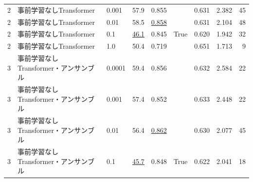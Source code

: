 \documentclass[12pt]{jarticle}
\numberwithin{equation}{section}    %
\numberwithin{figure}{section}      %
\numberwithin{table}{section}      %
\begin{document}
\begin{table}[bt]
\begin{center}
{\begin{tabular}{|l|l|l|rrc|rrr|}
                2                        & 事前学習なしTransformer        & 0.001                                    & 57.9                         & 0.855                     &                            & 0.631                         & 2.382                             & 45                         \\
                2                        & 事前学習なしTransformer        & 0.01                                     & 58.5                         & \underline{0.858}         &                            & 0.631                         & 2.104                             & 48                         \\
                2                        & 事前学習なしTransformer        & 0.1                                      & \underline{46.1}             & 0.845                     & True                       & 0.620                         & 1.942                             & 32                         \\
                2                        & 事前学習なしTransformer        & 1.0                                      & 50.4                         & 0.719                     &                            & 0.651                         & 1.713                             & 9                          \\
                \hline
                3                        & 事前学習なしTransformer・アンサンブル & 0.0001                                   & 59.4                         & 0.856                     &                            & 0.632                         & 2.584                             & 22                         \\
                3                        & 事前学習なしTransformer・アンサンブル & 0.001                                    & 57.4                         & 0.852                     &                            & 0.633                         & 2.448                             & 22                         \\
                3                        & 事前学習なしTransformer・アンサンブル & 0.01                                     & 56.4                         & \underline{0.862}         &                            & 0.630                         & 2.077                             & 45                         \\
                3                        & 事前学習なしTransformer・アンサンブル & 0.1                                      & \underline{45.7}             & 0.848                     & True                       & 0.622                         & 2.041                             & 18                         \\

\end{tabular}}
\end{center}
\end{table}
\end{document}
